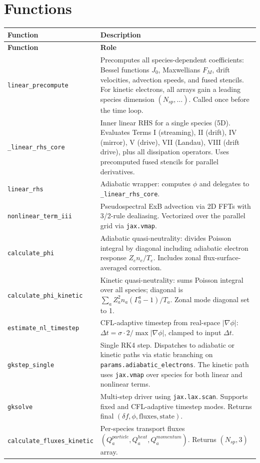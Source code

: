 \documentclass{article}
\theoremstyle{plain}
\theoremstyle{definition}
\theoremstyle{remark}
\begin{document}
\section{Functions}
\renewcommand{\arraystretch}{1.4}
\begin{longtable}{p{} p{}}
\toprule
\textbf{Function} & \textbf{Description} \\
\midrule
\endfirsthead
\toprule
\textbf{Function} & \textbf{Role} \\
\midrule
\endhead
\bottomrule
\endfoot
\texttt{linear\_precompute} & Precomputes all species-dependent coefficients: Bessel functions $J_0$, Maxwellians $F_M$, drift velocities, advection speeds, and fused stencils. For kinetic electrons, all arrays gain a leading species dimension $(N_{sp}, \ldots)$. Called once before the time loop. \\
\texttt{\_linear\_rhs\_core} & Inner linear RHS for a single species (5D). Evaluates Terms I (streaming), II (drift), IV (mirror), V (drive), VII (Landau), VIII (drift drive), plus all dissipation operators. Uses precomputed fused stencils for parallel derivatives. \\
\texttt{linear\_rhs} & Adiabatic wrapper: computes $\phi$ and delegates to \texttt{\_linear\_rhs\_core}. \\
\texttt{nonlinear\_term\_iii} & Pseudospectral ExB advection via 2D FFTs with 3/2-rule dealiasing. Vectorized over the parallel grid via \texttt{jax.vmap}. \\
\texttt{calculate\_phi} & Adiabatic quasi-neutrality: divides Poisson integral by diagonal including adiabatic electron response $Z_e n_e / T_e$. Includes zonal flux-surface-averaged correction. \\
\texttt{calculate\_phi\_kinetic} & Kinetic quasi-neutrality: sums Poisson integral over all species; diagonal is $\sum_a Z_a^2 n_a (\Gamma_0^a - 1)/T_a$. Zonal mode diagonal set to 1. \\
\texttt{estimate\_nl\_timestep} & CFL-adaptive timestep from real-space $|\nabla\phi|$: $\Delta t = \sigma \cdot 2 / \max|\nabla\phi|$, clamped to input $\Delta t$. \\
\texttt{gkstep\_single} & Single RK4 step. Dispatches to adiabatic or kinetic paths via static branching on \texttt{params.adiabatic\_electrons}. The kinetic path uses \texttt{jax.vmap} over species for both linear and nonlinear terms. \\
\texttt{gksolve} & Multi-step driver using \texttt{jax.lax.scan}. Supports fixed and CFL-adaptive timestep modes. Returns final $(\delta f, \phi, \text{fluxes}, \text{state})$. \\
\texttt{calculate\_fluxes\_kinetic} & Per-species transport fluxes $(Q_a^{particle}, Q_a^{heat}, Q_a^{momentum})$. Returns $(N_{sp}, 3)$ array. \\
\bottomrule
\end{longtable}
\renewcommand{\arraystretch}{1.0}
\end{document}
